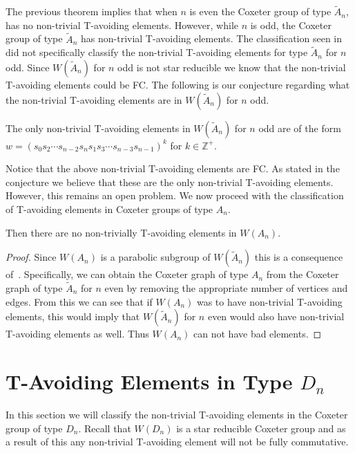 The previous theorem implies that when $n$ is even the Coxeter group of type $\widetilde{A}_n$, has no non-trivial T-avoiding elements. However, while $n$ is odd, the Coxeter group of type $\widetilde{A}_n$ has non-trivial T-avoiding elements. The classification seen in~\cite{Fan1999} did not specifically classify the non-trivial T-avoiding elements for type $\widetilde{A}_n$ for $n$ odd. Since $W(\widetilde{A}_n)$ for $n$ odd is not star reducible we know that the non-trivial T-avoiding elements could be FC. The following is our conjecture regarding what the non-trivial T-avoiding elements are in $W(\widetilde{A}_n)$ for $n$ odd.
\begin{conjecture}
	The only non-trivial T-avoiding elements in $W(\widetilde{A}_n)$ for $n$ odd are of the form $w=(s_0s_2 \cdots s_{n-2}s_ns_1s_3 \cdots s_{n-3}s_{n-1})^k$  for $k \in \mathbb{Z}^+$. 
\end{conjecture} 

Notice that the above non-trivial T-avoiding elements are FC. As stated in the conjecture we believe that these are the only non-trivial T-avoiding elements. However, this remains an open problem. We now proceed with the classification of T-avoiding elements in Coxeter groups of type $A_n$. 

\begin{corollary}
Then there are no non-trivially T-avoiding elements in $W(A_n)$. 
\begin{proof}
Since $W(A_n)$ is a parabolic subgroup of $W(\widetilde{A}_n)$ this is a consequence of~\cite[Proposition 3.1.2.]{Fan1999}. Specifically, we can obtain the Coxeter graph of type $A_n$ from the Coxeter graph of type $\widetilde{A}_n$ for $n$ even by removing the appropriate number of vertices and edges. From this we can see that if $W(A_n)$ was to have non-trivial T-avoiding elements, this would imply that $W(\widetilde{A}_n)$ for $n$ even would also have non-trivial T-avoiding elements as well. Thus $W(A_n)$ can not have bad elements.
\end{proof}
\end{corollary}



\section{T-Avoiding Elements in Type $D_n$}

In this section we will classify the non-trivial T-avoiding elements in the Coxeter group of type $D_n$. Recall that $W(D_n)$ is a star reducible Coxeter group and as a result of this any non-trivial T-avoiding element will not be fully commutative.

